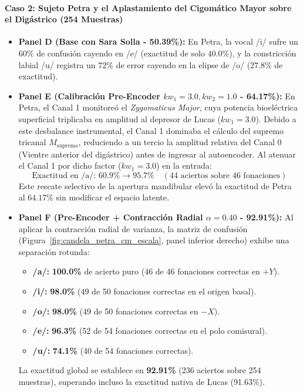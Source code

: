 \documentclass[11pt,a4paper,openany]{book}
\theoremstyle{definition}
\begin{document}
\paragraph{Caso 2: Sujeto Petra y el Aplastamiento del Cigomático Mayor sobre el Digástrico (254 Muestras)}
\begin{itemize}
    \item \textbf{Panel D (Base con Sara Solla - 50.39\%):} En Petra, la vocal /i/ sufre un $60\%$ de confusión cayendo en /e/ (exactitud de solo $40.0\%$), y la constricción labial /u/ registra un $72\%$ de error cayendo en la elipse de /o/ ($27.8\%$ de exactitud).
    \item \textbf{Panel E (Calibración Pre-Encoder $kw_1=3.0, kw_2=1.0$ - 64.17\%):} En Petra, el Canal 1 monitoreó el \textit{Zygomaticus Major}, cuya potencia bioeléctrica superficial triplicaba en amplitud al depresor de Lucas ($kw_1 = 3.0$). Debido a este desbalance instrumental, el Canal 1 dominaba el cálculo del supremo tricanal $M_{\text{supremo}}$, reduciendo a un tercio la amplitud relativa del Canal 0 (Vientre anterior del digástrico) antes de ingresar al autoencoder. Al atenuar el Canal 1 por dicho factor ($kw_1 = 3.0$) en la entrada:
    \begin{equation}
    \text{Exactitud en /a/: } 60.9\% \longrightarrow \mathbf{95.7\%} \quad (44 \text{ aciertos sobre } 46 \text{ fonaciones})
    \end{equation}
    Este rescate selectivo de la apertura mandibular elevó la exactitud de Petra al $64.17\%$ sin modificar el espacio latente.
    \item \textbf{Panel F (Pre-Encoder + Contracción Radial $\alpha=0.40$ - 92.91\%):} Al aplicar la contracción radial de varianza, la matriz de confusión (Figura~\ref{fig:candela_petra_cm_escala}, panel inferior derecho) exhibe una separación rotunda:
    \begin{itemize}
        \item \textbf{/a/:} \textbf{100.0\%} de acierto puro (46 de 46 fonaciones correctas en $+Y$).
        \item \textbf{/i/:} \textbf{98.0\%} (49 de 50 fonaciones correctas en el origen basal).
        \item \textbf{/o/:} \textbf{98.0\%} (49 de 50 fonaciones correctas en $-X$).
        \item \textbf{/e/:} \textbf{96.3\%} (52 de 54 fonaciones correctas en el polo comisural).
        \item \textbf{/u/:} \textbf{74.1\%} (40 de 54 fonaciones correctas).
    \end{itemize}
    La exactitud global se establece en \textbf{92.91\%} (236 aciertos sobre 254 muestras), superando incluso la exactitud nativa de Lucas (91.63\%).
\end{itemize}
\end{document}
